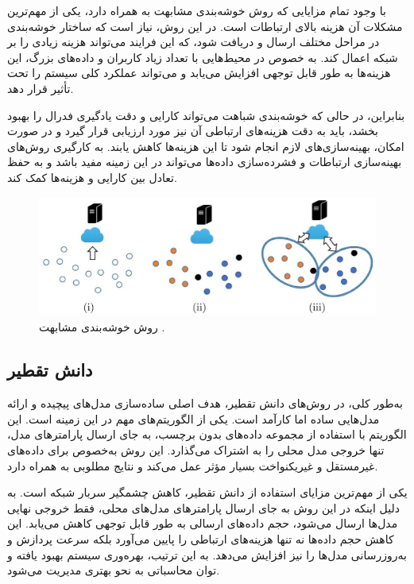 با وجود تمام مزایایی که روش خوشه‌بندی مشابهت به همراه دارد، یکی از مهم‌ترین مشکلات آن هزینه بالای ارتباطات است. در این روش، نیاز است که ساختار خوشه‌بندی در مراحل مختلف ارسال و دریافت شود، که این فرایند می‌تواند هزینه زیادی را بر شبکه اعمال کند. به خصوص در محیط‌هایی با تعداد زیاد کاربران و داده‌های بزرگ، این هزینه‌ها به طور قابل توجهی افزایش می‌یابد و می‌تواند عملکرد کلی سیستم را تحت تأثیر قرار دهد.

بنابراین، در حالی که خوشه‌بندی شباهت می‌تواند کارایی و دقت یادگیری فدرال را بهبود بخشد، باید به دقت هزینه‌های ارتباطی آن نیز مورد ارزیابی قرار گیرد و در صورت امکان، بهینه‌سازی‌های لازم انجام شود تا این هزینه‌ها کاهش یابند. به کارگیری روش‌های بهینه‌سازی ارتباطات و فشرده‌سازی داده‌ها می‌تواند در این زمینه مفید باشد و به حفظ تعادل بین کارایی و هزینه‌ها کمک کند.

\begin{figure}[t]
	\centering
	\includegraphics[scale=0.9]{images/chap3/similarity_clustering.png}%
	\caption{%
		روش خوشه‌بندی مشابهت 
		\cite{ghosh2019robust}%
		.
	}
	\label{similarity_clustering}
	\centering
\end{figure}

\subsection{
	دانش تقطیر%
	\protect
}
به‌طور کلی، در روش‌های دانش تقطیر، هدف اصلی ساده‌سازی مدل‌های پیچیده و ارائه مدل‌هایی ساده اما کارآمد است. یکی از الگوریتم‌های مهم در این زمینه
%
است. این الگوریتم با استفاده از مجموعه داده‌های بدون برچسب، به جای ارسال پارامترهای مدل، تنها خروجی مدل محلی را به اشتراک می‌گذارد. این روش به‌خصوص برای داده‌های غیرمستقل و غیریکنواخت بسیار مؤثر عمل می‌کند و نتایج مطلوبی به همراه دارد.

یکی از مهم‌ترین مزایای استفاده از دانش تقطیر، کاهش چشمگیر سربار شبکه است. به دلیل اینکه در این روش به جای ارسال پارامترهای مدل‌های محلی، فقط خروجی نهایی مدل‌ها ارسال می‌شود، حجم داده‌های ارسالی به طور قابل توجهی کاهش می‌یابد. این کاهش حجم داده‌ها نه تنها هزینه‌های ارتباطی را پایین می‌آورد بلکه سرعت پردازش و به‌روزرسانی مدل‌ها را نیز افزایش می‌دهد. به این ترتیب، بهره‌وری سیستم بهبود یافته و توان محاسباتی به نحو بهتری مدیریت می‌شود.

